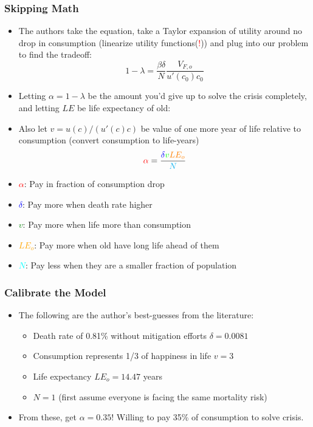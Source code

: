 \documentclass{beamer}
\begin{document}
\begin{frame}
\frametitle[alignment=center]{Skipping Math}
\begin{itemize}
\item The authors take the equation, take a Taylor expansion of utility around no drop in consumption (linearize utility functions(\textcolor{red}{!})) and plug into our problem to find the tradeoff:
$$1-\lambda=\frac{\beta\delta}{N}\frac{V_{F,o}}{u'(c_0)c_0}$$
\item Letting $\alpha=1-\lambda$ be the amount you'd give up to solve the crisis completely, and letting $LE$ be life expectancy of old:
\item Also let $v=u(c)/(u'(c)c)$ be value of one more year of life relative to consumption (convert consumption to life-years)
$$\textcolor{red}{\alpha}=\frac{\textcolor{blue}{\delta}\textcolor{green}{v}\textcolor{orange}{LE_o}}{\textcolor{cyan}{N}}$$
\item \textcolor{red}{$\alpha$}: Pay in fraction of consumption drop
\item \textcolor{blue}{$\delta$}: Pay more when death rate higher
\item \textcolor{green}{$v$}: Pay more when life more than consumption
\item \textcolor{orange}{$LE_o$}: Pay more when old have long life ahead of them
\item \textcolor{cyan}{$N$}: Pay less when they are a smaller fraction of population
\end{itemize}
\end{frame}

\begin{frame}
\frametitle[alignment=center]{Calibrate the Model}
\begin{itemize}
\item The following are the author's best-guesses from the literature:
\begin{itemize}
\item Death rate of 0.81\% without mitigation efforts $\delta=0.0081$
\item Consumption represents 1/3 of happiness in life $v=3$
\item Life expectancy $LE_o=14.47$ years
\item $N=1$ (first assume everyone is facing the same mortality risk)
\end{itemize}
\item From these, get $\alpha=0.35$!  Willing to pay 35\% of consumption to solve crisis.
\end{itemize}
\end{frame}
\end{document}
